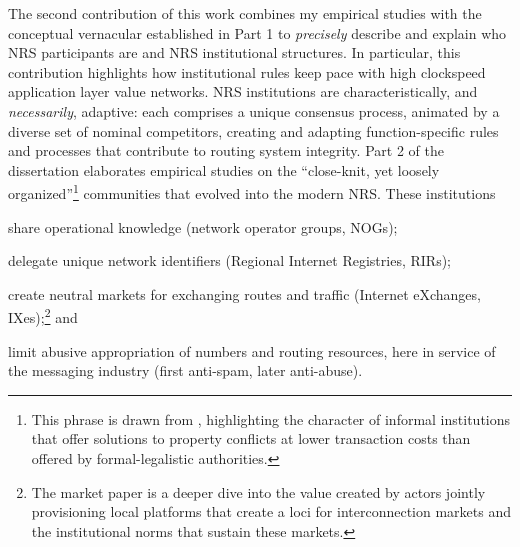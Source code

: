 \documentclass[12pt,journal,compsoc,letterpaper,onecolumn,twoside]{IEEEtran}
\begin{document}
The second contribution of this work combines my empirical studies
with the conceptual vernacular established in Part 1 to
\emph{precisely} describe and explain who NRS participants are and NRS institutional 
structures.
%
In particular, this contribution highlights how institutional rules keep pace with high 
clockspeed application layer value networks.
%
NRS institutions are characteristically, and \emph{necessarily},
adaptive: each comprises a unique consensus process, animated by a
diverse set of nominal competitors, creating and adapting
function-specific rules
and processes that contribute to routing system integrity.
%
Part 2 of the dissertation elaborates empirical studies on the ``close-knit, yet loosely
organized''\footnote{This phrase is drawn from
  , highlighting the character of informal
  institutions that offer solutions to property conflicts at lower
  transaction costs than offered by formal-legalistic authorities.}
communities that evolved into the modern NRS.
%
These institutions 
%
\begin{inparaenum}[\itshape 1\upshape)]
  \item share operational knowledge (network operator groups, NOGs); 
  \item delegate unique network identifiers (Regional Internet
    Registries, RIRs);
  \item create neutral markets for exchanging routes and traffic
    (Internet eXchanges, IXes);\footnote{The market paper is a deeper
      dive into the value created by actors jointly provisioning local
      platforms that create a loci for interconnection markets and the
      institutional norms that sustain these markets.} and  
  \item limit abusive appropriation of numbers and routing resources,
    here in service of the messaging industry (first anti-spam, later
    anti-abuse). 
\end{inparaenum}
%
\end{document}
